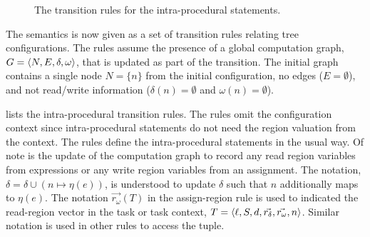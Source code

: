 \begin{figure}
\begin{center}
  \end{center}
  \caption{The transition rules for the intra-procedural statements.}
  \label{fig:intra}
\end{figure}

The semantics is now given as a set of transition rules relating tree configurations. The rules assume the presence of a global computation graph, $G = \langle N, E, \delta, \omega \rangle $, that is updated as part of the transition. The initial graph contains a single node $N = \{n\}$ from the initial configuration, no edges ($E = \emptyset$), and not read/write information ($\delta(n) = \emptyset$ and $\omega(n) = \emptyset$).

 lists the intra-procedural transition rules. The rules omit the configuration context since intra-procedural statements do not need the region valuation from the context. The rules define the intra-procedural statements in the usual way. Of note is the update of the computation graph to record any read region variables from expressions or any write region variables from an assignment. The notation, $\delta = \delta \cup (n \mapsto \eta(e))$, is understood to update $\delta$ such that $n$ additionally maps to $\eta(e)$. 
The notation $\vec{r_\omega}(T)$ in the assign-region rule is used to indicated the read-region vector in the task or task context, $T = \langle \ell,  S, d, \vec{r_\delta}, \vec{r_\omega}, n \rangle $. Similar notation is used in other rules to access the tuple.

